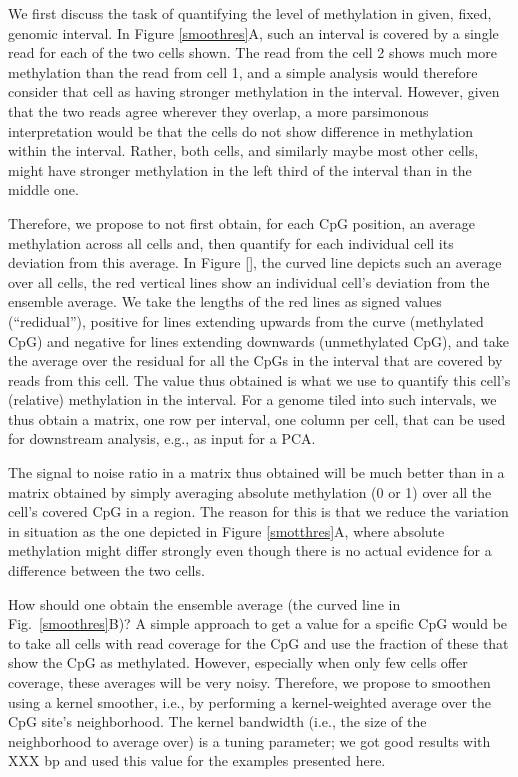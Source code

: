 \documentclass[twocolumn,10pt]{article}
\begin{document}
We first discuss the task of quantifying the level of methylation in given, fixed, genomic interval. In Figure \ref{smoothres}A, such an interval is covered by a single read for each of the two cells shown. The read from the cell 2 shows much more methylation than the read from cell 1, and a simple analysis would therefore consider that cell as having stronger methylation in the interval. However, given that the two reads agree wherever they overlap, a more parsimonous interpretation would be that the cells do not show difference in methylation within the interval. Rather, both cells, and similarly maybe most other cells, might have stronger methylation in the left third of the interval than in the middle one.

Therefore, we propose to not first obtain, for each CpG position, an average methylation across all cells and, then quantify for each individual cell its deviation from this average. In Figure \ref{}, the curved line depicts such an average over all cells, the red vertical lines show an individual cell's deviation from the ensemble average. We take the lengths of the red lines as signed values (``redidual''), positive for lines extending upwards from the curve (methylated CpG) and negative for lines extending downwards (unmethylated CpG), and take the average over the residual for all the CpGs in the interval that are covered by reads from this cell. The value thus obtained is what we use to quantify this cell's (relative) methylation in the interval. For a genome tiled into such intervals, we thus obtain a matrix, one row per interval, one column per cell, that can be used for downstream analysis, e.g., as input for a PCA.

The signal to noise ratio in a matrix thus obtained will be much better than in a matrix obtained by simply averaging absolute methylation (0 or 1) over all the cell's covered CpG in a region. The reason for this is that we reduce the variation in situation as the one depicted in Figure \ref{smotthres}A, where absolute methylation might differ strongly even though there is no actual evidence for a difference between the two cells.

How should one obtain the ensemble average (the curved line in Fig.\ \ref{smoothres}B)? A simple approach to get a value for a spcific CpG would be to take all cells with read coverage for the CpG and use the fraction of these that show the CpG as methylated. However, especially when only few cells offer coverage, these averages will be very noisy. Therefore, we propose to smoothen using a kernel smoother, i.e., by performing a kernel-weighted average over the CpG site's neighborhood. The kernel bandwidth (i.e., the size of the neighborhood to average over) is a tuning parameter; we got good results with XXX bp and used this value for the examples presented here.
\end{document}
